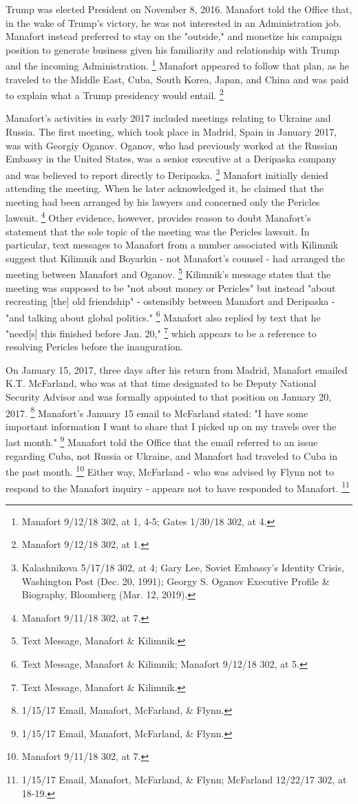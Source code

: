 Trump was elected President on November 8, 2016.
Manafort told the Office that, in the wake of Trump's victory, he was not interested in an Administration job.
Manafort instead preferred to stay on the "outside," and monetize his campaign position to generate business given his familiarity and relationship with Trump and the incoming Administration.%
\footnote{Manafort 9/12/18 302, at 1, 4-5;
Gates 1/30/18 302, at 4.}
Manafort appeared to follow that plan, as he traveled to the Middle East, Cuba, South Korea, Japan, and China and was paid to explain what a Trump presidency would entail.%
\footnote{Manafort 9/12/18 302, at 1.}

Manafort's activities in early 2017 included meetings relating to Ukraine and Russia.
The first meeting, which took place in Madrid, Spain in January 2017, was with Georgiy Oganov.
Oganov, who had previously worked at the Russian Embassy in the United States, was a senior executive at a Deripaska company and was believed to report directly to Deripaska.%
\footnote{Kalashnikova 5/17/18 302, at 4;
Gary Lee, Soviet Embassy’s Identity Crisis, Washington Post (Dec. 20, 1991);
Georgy S. Oganov Executive Profile \& Biography, Bloomberg (Mar. 12, 2019).}
Manafort initially denied attending the meeting.
When he later acknowledged it, he claimed that the meeting had been arranged by his lawyers and concerned only the Pericles lawsuit.%
\footnote{Manafort 9/11/18 302, at 7.}
Other evidence, however, provides reason to doubt Manafort's statement that the sole topic of the meeting was the Pericles lawsuit.
In particular, text messages to Manafort from a number associated with Kilimnik suggest that Kilimnik and Boyarkin - not Manafort's counsel - had arranged the meeting between Manafort and Oganov.%
\footnote{Text Message, Manafort \& Kilimnik.}
Kilimnik's message states that the meeting was supposed to be "not about money or Pericles" but instead "about recreating [the] old friendship" - ostensibly between Manafort and Deripaska - "and talking about global politics."%
\footnote{Text Message, Manafort \& Kilimnik;
Manafort 9/12/18 302, at 5.}
Manafort also replied by text that he "need[s] this finished before Jan. 20,"%
\footnote{Text Message, Manafort \& Kilimnik.}
which appears to be a reference to resolving Pericles before the inauguration.

On January 15, 2017, three days after his return from Madrid, Manafort emailed K.T. McFarland, who was at that time designated to be Deputy National Security Advisor and was formally appointed to that position on January 20, 2017.%
\footnote{1/15/17 Email, Manafort, McFarland, \& Flynn.}
Manafort's January 15 email to McFarland stated: "I have some important information I want to share that I picked up on my travels over the last month."%
\footnote{1/15/17 Email, Manafort, McFarland, \& Flynn.}
Manafort told the Office that the email referred to an issue regarding Cuba, not Russia or Ukraine, and Manafort had traveled to Cuba in the past month.%
\footnote{Manafort 9/11/18 302, at 7.}
Either way, McFarland - who was advised by Flynn not to respond to the Manafort inquiry - appears not to have responded to Manafort.%
\footnote{1/15/17 Email, Manafort, McFarland, \& Flynn;
McFarland 12/22/17 302, at 18-19.}

